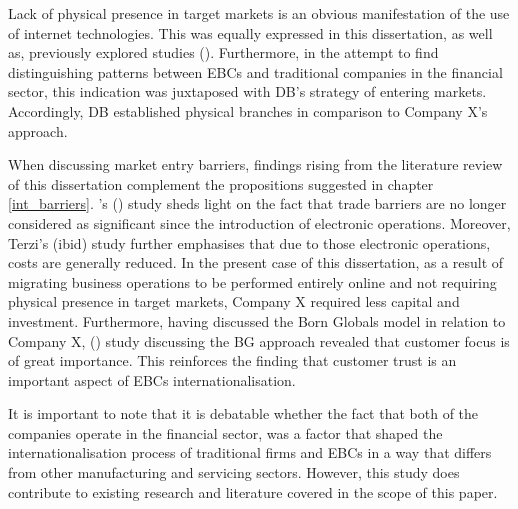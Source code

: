 \documentclass[11pt,a4paper]{article}
\begin{document}
{{{Lack of physical presence in target markets is an obvious manifestation of the use of internet technologies. This was equally expressed in this dissertation, as well as, previously explored studies (\cite{loaneCrossnationalComparisonInternationalisation2002}). Furthermore, in the attempt to find distinguishing patterns between EBCs and traditional companies in the financial sector, this indication was juxtaposed with DB's strategy of entering markets. Accordingly, DB established physical branches in comparison to Company X's approach. \par
When discussing market entry barriers, findings rising from the literature review of this dissertation complement the propositions suggested in chapter \ref{int_barriers}. \citeauthor{terziImpactEcommerceInternational2011}'s (\citeyear{terziImpactEcommerceInternational2011}) study sheds light on the fact that trade barriers are no longer considered as significant since the introduction of electronic operations. Moreover, Terzi's (ibid) study further emphasises that due to those electronic operations, costs are generally reduced. In the present case of this dissertation, as a result of migrating business operations to be performed entirely online and not requiring physical presence in target markets, Company X required less capital and investment. Furthermore, having discussed the Born Globals model 
in relation to Company X, \citeauthor{fangParachutingInternationalizationStudy2017} (\citeyear{fangParachutingInternationalizationStudy2017}) study discussing the BG approach revealed that customer focus is of great importance. This reinforces the finding that customer trust is an important aspect of EBCs internationalisation. \par
It is important to note that it is debatable whether the fact that both of the companies operate in the financial sector, was a factor that shaped the internationalisation process of traditional firms and EBCs in a way that differs from other manufacturing and servicing sectors. However, this study does contribute to existing research and literature covered in the scope of this paper.

\newpage
}}}
\end{document}
